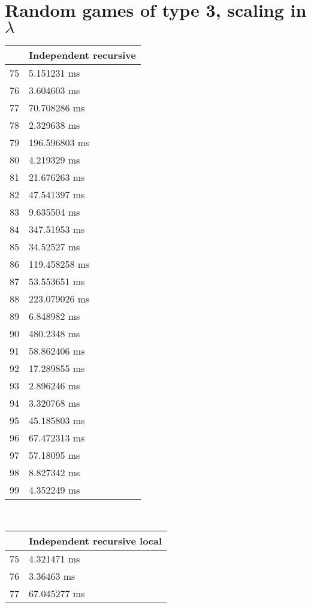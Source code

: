 \section{Random games of type 3, scaling in $\lambda$}
\begin{multicols}{2}
	\begin{tabular}{|l|l|}
		\hline
		& Independent recursive \\ \hline
		75 & 5.151231 ms \\ \hline
		76 & 3.604603 ms \\ \hline
		77 & 70.708286 ms \\ \hline
		78 & 2.329638 ms \\ \hline
		79 & 196.596803 ms \\ \hline
		80 & 4.219329 ms \\ \hline
		81 & 21.676263 ms \\ \hline
		82 & 47.541397 ms \\ \hline
		83 & 9.635504 ms \\ \hline
		84 & 347.51953 ms \\ \hline
		85 & 34.52527 ms \\ \hline
		86 & 119.458258 ms \\ \hline
		87 & 53.553651 ms \\ \hline
		88 & 223.079026 ms \\ \hline
		89 & 6.848982 ms \\ \hline
		90 & 480.2348 ms \\ \hline
		91 & 58.862406 ms \\ \hline
		92 & 17.289855 ms \\ \hline
		93 & 2.896246 ms \\ \hline
		94 & 3.320768 ms \\ \hline
		95 & 45.185803 ms \\ \hline
		96 & 67.472313 ms \\ \hline
		97 & 57.18095 ms \\ \hline
		98 & 8.827342 ms \\ \hline
		99 & 4.352249 ms \\ \hline
	\end{tabular}\\
	\begin{tabular}{|l|l|}
		\hline
		& Independent recursive local \\ \hline
		75 & 4.321471 ms \\ \hline
		76 & 3.36463 ms \\ \hline
		77 & 67.045277 ms \\ \hline

\end{tabular}
\end{multicols}
